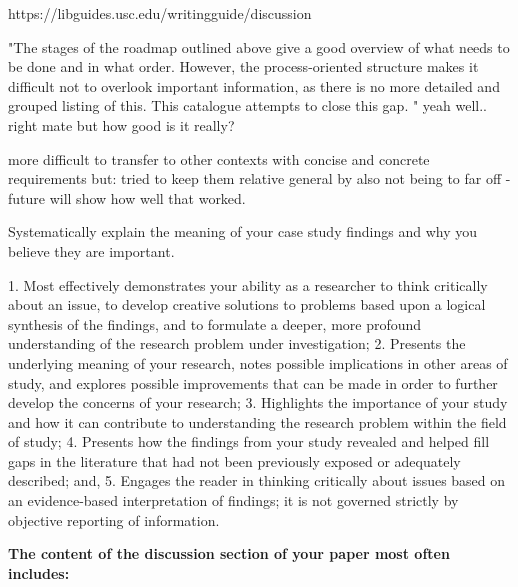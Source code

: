 https://libguides.usc.edu/writingguide/discussion

"The stages of the roadmap outlined above give a good overview of what needs to be done and in what order. However, the process-oriented structure makes it difficult not to overlook important information, as there is no more detailed and grouped listing of this. This catalogue attempts to close this gap. " yeah well.. right mate but how good is it really?

more difficult to transfer to other contexts with concise and concrete requirements but: tried to keep them relative general by also not being to far off - future will show how well that worked.

Systematically explain the meaning of your case study findings and why you believe they are important. 



1. Most effectively demonstrates your ability as a researcher to think critically about an issue, to develop creative solutions to problems based upon a logical synthesis of the findings, and to formulate a deeper, more profound understanding of the research problem under investigation;
2. Presents the underlying meaning of your research, notes possible implications in other areas of study, and explores possible improvements that can be made in order to further develop the concerns of your research;
3. Highlights the importance of your study and how it can contribute to understanding the research problem within the field of study;
4. Presents how the findings from your study revealed and helped fill gaps in the literature that had not been previously exposed or adequately described; and,
5. Engages the reader in thinking critically about issues based on an evidence-based interpretation of findings; it is not governed strictly by objective reporting of information.


\textbf{The content of the discussion section of your paper most often includes:}

